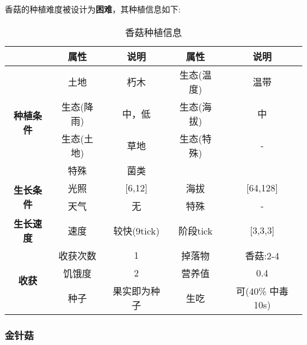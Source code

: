 香菇的种植难度被设计为\textbf{困难}，其种植信息如下:

\begin{table}[H]
    \centering
    \caption{香菇种植信息}
    \label{table:香菇种植信息}
    \setlength{\tabcolsep}{4mm}
    \begin{tabular}{c|cc|cc}
        \toprule
                                           & \textbf{属性} & \textbf{说明} & \textbf{属性} & \textbf{说明} \\
        \midrule
        \multirow{4}{*}{\textbf{种植条件}} & 土地          & 朽木          & 生态(温度)    & 温带    \\
                                           & 生态(降雨)    & 中，低        & 生态(海拔)    & 中            \\
                                           & 生态(土地)    & 草地          & 生态(特殊)    & -             \\
                                           & 特殊          & 菌类           \\
        \midrule
        \multirow{2}{*}{\textbf{生长条件}} & 光照          & [6,12]        & 海拔          & [64,128]      \\
                                           & 天气          & 无            & 特殊          & -             \\
        \midrule
        \textbf{生长速度}                  & 速度          & 较快(9tick)     & 阶段tick      & [3,3,3]       \\
        \midrule
        \multirow{3}{*}{\textbf{收获}}     & 收获次数      & 1             & 掉落物        & 香菇:2-4      \\
                                           & 饥饿度        & 2             & 营养值        & 0.4           \\
                                           & 种子          & 果实即为种子  & 生吃          & 可(40\% 中毒 10s)   \\
        \bottomrule
    \end{tabular}
\end{table}

\subsubsection{金针菇}

